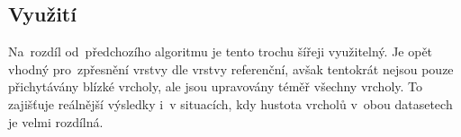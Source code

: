 \subsection{Využití}
\label{ca-vyuziti}

Na~rozdíl od~předchozího algoritmu je tento trochu šířeji využitelný. Je opět 
vhodný pro~zpřesnění vrstvy dle vrstvy referenční, avšak tentokrát nejsou 
pouze přichytávány blízké vrcholy, ale jsou upravovány téměř všechny vrcholy. 
To zajišťuje reálnější výsledky i~v situacích, kdy hustota vrcholů v~obou 
datasetech je velmi rozdílná.

